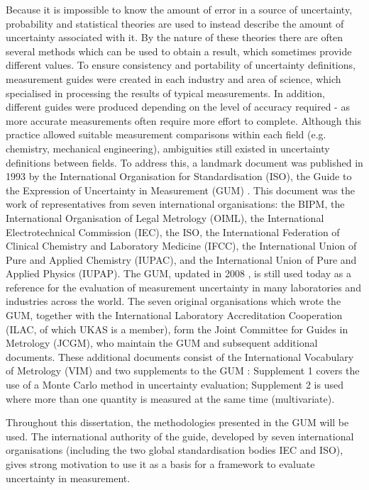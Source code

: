 \documentclass[../thesis/thesis.tex]{subfiles}
\begin{document}
\begin{refsection}
Because it is impossible to know the amount of error in a source of uncertainty, probability and statistical theories are used to instead describe the amount of uncertainty associated with it. By the nature of these theories there are often several methods which can be used to obtain a result, which sometimes provide different values. To ensure consistency and portability of uncertainty definitions, measurement guides were created in each industry and area of science, which specialised in processing the results of typical measurements. In addition, different guides were produced depending on the level of accuracy required - as more accurate measurements often require more effort to complete. Although this practice allowed suitable measurement comparisons within each field (e.g. chemistry, mechanical engineering), ambiguities still existed in uncertainty definitions between fields. To address this, a landmark document was published in 1993 by the International Organisation for Standardisation (ISO), the Guide to the Expression of Uncertainty in Measurement (GUM) \cite{GUM_1993}. This document was the work of representatives from seven international organisations: the BIPM, the International Organisation of Legal Metrology (OIML), the International Electrotechnical Commission (IEC), the ISO, the International Federation of Clinical Chemistry and Laboratory Medicine (IFCC), the International Union of Pure and Applied Chemistry (IUPAC), and the International Union of Pure and Applied Physics (IUPAP). The GUM, updated in 2008 \cite{GUM_2008}, is still used today as a reference for the evaluation of measurement uncertainty in many laboratories and industries across the world. The seven original organisations which wrote the GUM, together with the International Laboratory Accreditation Cooperation (ILAC, of which UKAS is a member), form the Joint Committee for Guides in Metrology (JCGM), who maintain the GUM and subsequent additional documents. These additional documents consist of the International Vocabulary of Metrology (VIM) \cite{VIM} and two supplements to the GUM \cite{GUM_S1,GUM_S2}: Supplement 1 covers the use of a Monte Carlo method \cite{Metropolis_1949} in uncertainty evaluation; Supplement 2 is used where more than one quantity is measured at the same time (multivariate).

Throughout this dissertation, the methodologies presented in the GUM will be used. The international authority of the guide, developed by seven international organisations (including the two global standardisation bodies IEC and ISO), gives strong motivation to use it as a basis for a framework to evaluate uncertainty in measurement.


\end{refsection}
\end{document}

